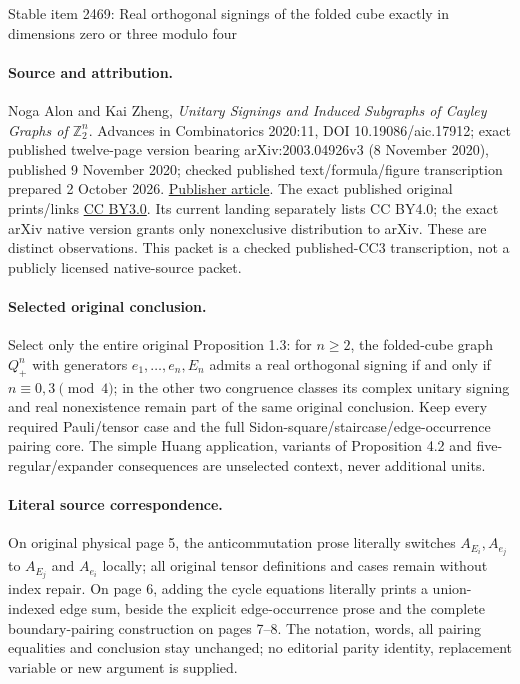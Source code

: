 \documentclass[11pt]{article}
\begin{document}
\begin{center}{\Large Stable item 2469: Real orthogonal signings of the folded cube exactly in dimensions zero or three modulo four}\end{center}
\paragraph{Source and attribution.} Noga Alon and Kai Zheng, \emph{Unitary Signings and Induced Subgraphs of Cayley Graphs of \(\mathbb{Z}_2^n\)}. Advances in Combinatorics 2020:11, DOI 10.19086/aic.17912; exact published twelve-page version bearing arXiv:2003.04926v3 (8 November 2020), published 9 November 2020; checked published text/formula/figure transcription prepared 2 October 2026. \href{https://www.advancesincombinatorics.com/article/17912-unitary-signings-and-induced-subgraphs-of-cayley-graphs-of-mathbb-z-_2-n}{Publisher article}. The exact published original prints/links \href{https://creativecommons.org/licenses/by/3.0/}{CC BY3.0}. Its current landing separately lists CC BY4.0; the exact arXiv native version grants only nonexclusive distribution to arXiv. These are distinct observations. This packet is a checked published-CC3 transcription, not a publicly licensed native-source packet.
\paragraph{Selected original conclusion.} Select only the entire original Proposition 1.3: for \(n\ge2\), the folded-cube graph \(Q_+^n\) with generators \(e_1,\ldots,e_n,E_n\) admits a real orthogonal signing if and only if \(n\equiv0,3\pmod4\); in the other two congruence classes its complex unitary signing and real nonexistence remain part of the same original conclusion. Keep every required Pauli/tensor case and the full Sidon-square/staircase/edge-occurrence pairing core. The simple Huang application, variants of Proposition 4.2 and five-regular/expander consequences are unselected context, never additional units.
\paragraph{Literal source correspondence.} On original physical page 5, the anticommutation prose literally switches \(A_{E_i},A_{e_j}\) to \(A_{E_j}\) and \(A_{e_i}\) locally; all original tensor definitions and cases remain without index repair. On page 6, adding the cycle equations literally prints a union-indexed edge sum, beside the explicit edge-occurrence prose and the complete boundary-pairing construction on pages 7--8. The notation, words, all pairing equalities and conclusion stay unchanged; no editorial parity identity, replacement variable or new argument is supplied.
\end{document}
